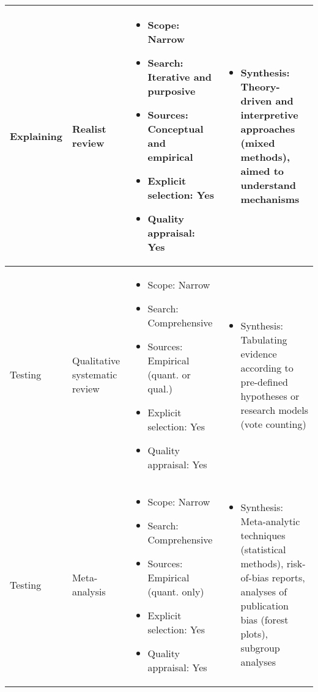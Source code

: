 \documentclass[11pt]{scrartcl}
\theoremstyle{aufgabenstyle}
\begin{document}
\begin{table}[H]
\begin{tabularx}{\textwidth}{l p{2.4cm} X X}
		Explaining & Realist review & 
		\begin{itemize}[leftmargin=*, noitemsep, topsep=0pt]
			\item Scope: Narrow
			\item Search: Iterative and purposive
			\item Sources: Conceptual and empirical
			\item Explicit selection: Yes
\item Quality appraisal: Yes
		\end{itemize} & 
		\begin{itemize}[leftmargin=*, noitemsep, topsep=0pt]
			\item Synthesis: Theory-driven and interpretive approaches (mixed methods), aimed to understand mechanisms
		\end{itemize} \\
		\midrule
		Testing & Qualitative systematic review & 
		\begin{itemize}[leftmargin=*, noitemsep, topsep=0pt]
			\item Scope: Narrow
			\item Search: Comprehensive
			\item Sources: Empirical (quant. or qual.)
			\item Explicit selection: Yes
			\item Quality appraisal: Yes
		\end{itemize} & 
		\begin{itemize}[leftmargin=*, noitemsep, topsep=0pt]
			\item Synthesis: Tabulating evidence according to pre-defined hypotheses or research models (vote counting)
		\end{itemize} \\
		Testing & Meta-analysis & 
		\begin{itemize}[leftmargin=*, noitemsep, topsep=0pt]
			\item Scope: Narrow
			\item Search: Comprehensive
			\item Sources: Empirical (quant. only)
			\item Explicit selection: Yes
			\item Quality appraisal: Yes
		\end{itemize} & 
		\begin{itemize}[leftmargin=*, noitemsep, topsep=0pt]
			\item Synthesis: Meta-analytic techniques (statistical methods), risk-of-bias reports, analyses of publication bias (forest plots), subgroup analyses

\end{itemize}
\end{tabularx}
\end{table}
\end{document}

